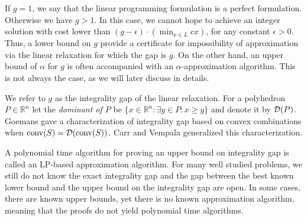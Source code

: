 {\vspace*{5pt}
\noindent{}
\vspace*{3pt}

If $g=1$, we say that the linear programming formulation is a perfect formulation. Otherwise we have $g>1$. In this case, we cannot hope to achieve an integer solution with cost lower than $(g-\epsilon)\cdot (\min_{x\in L}cx)$, for any constant $\epsilon>0$. Thus, a lower bound on $g$ provide a certificate for impossibility of approximation via the linear relaxation for which the gap is $g$. On the other hand, an upper bound of $\alpha$ for $g$ is often accompanied with an $\alpha$-approximation algorithm. This is not always the case, as we will later discuss in details.

We refer to $g$ as the integrality gap of the linear relaxation. For a polyhedron $P\in \mathbb{R}^n$ let the \textit{dominant of $P$} be $\{x\in \mathbb{R}^n: \exists y \in P: x\geq y\}$ and denote it by $\operatorname{\mathcal{D}}(P)$. Goemans \cite{goemansblocking} gave a characterization of integrality gap based on convex combinations when $\operatorname{conv}(S)=\mathcal{D}(\operatorname{conv}(S))$. Carr and Vempala \cite{Carr2004} generalized this characterization.


\vspace*{5pt}
\noindent{}
\vspace*{5pt}




A polynomial time algorithm for proving an upper bound on integrality gap is called an LP-based approximation algorithm. For many well studied problems, we still do not know the exact integrality gap and the gap between the best known lower bound and the upper bound on the integrality gap are open. In some cases, there are known upper bounds, yet there is no known approximation algorithm, meaning that the proofs do not yield polynomial time algorithms.
}\fi 
